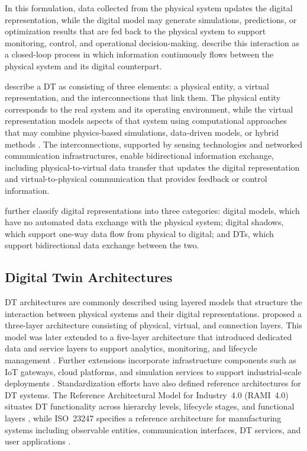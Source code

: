 In this formulation, data collected from the physical system updates the digital representation, while the digital model may generate simulations, predictions, or optimization results that are fed back to the physical system to support monitoring, control, and operational decision-making. \citet{tao2018digital} describe this interaction as a closed-loop process in which information continuously flows between the physical system and its digital counterpart.

\citet{vanderhorn2021digital} describe a DT as consisting of three elements: a physical entity, a virtual representation, and the interconnections that link them. The physical entity corresponds to the real system and its operating environment, while the virtual representation models aspects of that system using computational approaches that may combine physics-based simulations, data-driven models, or hybrid methods \cite{negri2017review}. The interconnections, supported by sensing technologies and networked communication infrastructures, enable bidirectional information exchange, including physical-to-virtual data transfer that updates the digital representation and virtual-to-physical communication that provides feedback or control information.

\citet{kritzinger2018digital} further classify digital representations into three categories: digital models, which have no automated data exchange with the physical system; digital shadows, which support one-way data flow from physical to digital; and DTs, which support bidirectional data exchange between the two.

\subsection{Digital Twin Architectures}

DT architectures are commonly described using layered models that structure the interaction between physical systems and their digital representations. \citet{tao2018digital} proposed a three-layer architecture consisting of physical, virtual, and connection layers. This model was later extended to a five-layer architecture that introduced dedicated data and service layers to support analytics, monitoring, and lifecycle management \cite{tao2019digital}. Further extensions incorporate infrastructure components such as IoT gateways, cloud platforms, and simulation services to support industrial-scale deployments \cite{redelinghuys2020six}. Standardization efforts have also defined reference architectures for DT systems. The Reference Architectural Model for Industry~4.0 (RAMI~4.0) situates DT functionality across hierarchy levels, lifecycle stages, and functional layers \cite{DIN91345}, while ISO~23247 specifies a reference architecture for manufacturing systems including observable entities, communication interfaces, DT services, and user applications \cite{ISO23247-1}.

